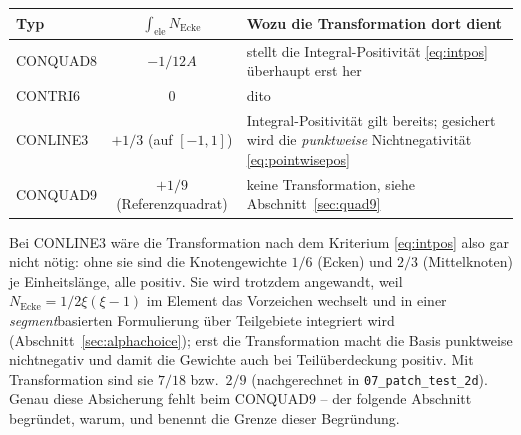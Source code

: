 \documentclass[a4paper,11pt]{article}
\def\tfrac#1#2{#1/#2}%
\newcommand{\file}[1]{\texttt{\small #1}}
\begin{document}
\begin{center}
\small
\begin{tabularx}{\linewidth}{lcX}
\toprule
Typ & $\int_{\text{ele}} N_{\text{Ecke}}$ & Wozu die Transformation dort dient \\
\midrule
CONQUAD8 & $-\tfrac{1}{12}A$ & stellt die Integral-Positivität \eqref{eq:intpos} überhaupt erst her \\
CONTRI6  & $0$               & dito \\
CONLINE3 & $+\tfrac13$ (auf $[-1,1]$) & Integral-Positivität gilt bereits; gesichert wird die
   \emph{punktweise} Nichtnegativität \eqref{eq:pointwisepos} \\
CONQUAD9 & $+\tfrac19$ (Referenzquadrat) & keine Transformation, siehe Abschnitt~\ref{sec:quad9} \\
\bottomrule
\end{tabularx}
\end{center}

\noindent Bei CONLINE3 wäre die Transformation nach dem Kriterium \eqref{eq:intpos} also gar nicht
nötig: ohne sie sind die Knotengewichte $\tfrac16$ (Ecken) und $\tfrac23$ (Mittelknoten) je
Einheitslänge, alle positiv. Sie wird trotzdem angewandt, weil
$N_{\text{Ecke}}=\tfrac12\xi(\xi-1)$ im Element das Vorzeichen wechselt und in einer
\emph{segment}basierten Formulierung über Teilgebiete integriert wird
(Abschnitt~\ref{sec:alphachoice}); erst die Transformation macht die Basis punktweise
nichtnegativ und damit die Gewichte auch bei Teilüberdeckung positiv. Mit Transformation sind sie
$\tfrac{7}{18}$ bzw.\ $\tfrac29$ (nachgerechnet in \file{07\_patch\_test\_2d}). Genau diese
Absicherung fehlt beim CONQUAD9 -- der folgende Abschnitt begründet, warum, und benennt die Grenze
dieser Begründung.
\end{document}
